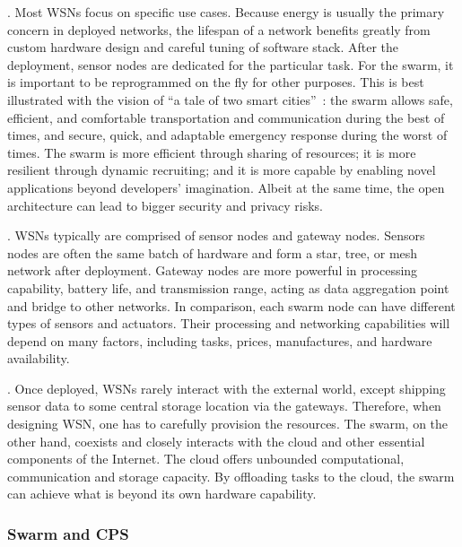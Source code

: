 . Most WSNs
focus on specific use cases. Because energy is usually the primary concern in
deployed networks, the lifespan of a network benefits greatly from custom
hardware design and careful tuning of software stack. After the deployment,
sensor nodes are dedicated for the particular task. For the swarm, it is
important to be reprogrammed on the fly for other purposes. This is best
illustrated with the vision of ``a tale of two smart
cities''~\cite{lee2012terraswarm}: the swarm allows safe, efficient, and
comfortable transportation and communication during the best of times, and
secure, quick, and adaptable emergency response during the worst of times. The
swarm is more efficient through sharing of resources; it is more resilient
through dynamic recruiting; and it is more capable by enabling novel
applications beyond developers' imagination. Albeit at the same time, the open
architecture can lead to bigger security and privacy risks.

. WSNs
typically are comprised of sensor nodes and gateway nodes. Sensors nodes are
often the same batch of hardware and form a star, tree, or mesh network after
deployment. Gateway nodes are more powerful in processing capability, battery
life, and transmission range, acting as data aggregation point and bridge to
other networks. In comparison, each swarm node can have different types of
sensors and actuators. Their processing and networking capabilities will depend
on many factors, including tasks, prices, manufactures, and hardware
availability.

. Once deployed, WSNs rarely interact with the external world,
except shipping sensor data to some central storage location via the
gateways. Therefore, when designing WSN, one has to carefully provision the
resources. The swarm, on the other hand, coexists and closely interacts with the
cloud and other essential components of the Internet. The cloud offers unbounded
computational, communication and storage capacity. By offloading tasks to the
cloud, the swarm can achieve what is beyond its own hardware capability.

\subsubsection{Swarm and CPS}
\label{sec:swarm-cps}


